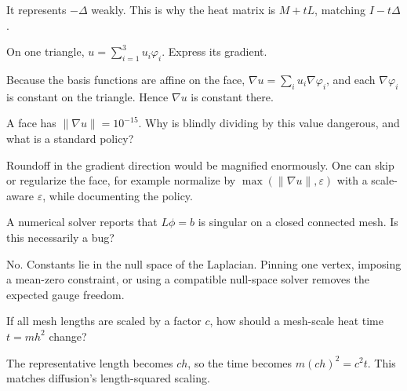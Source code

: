 \begin{solution}
It represents \(-\Delta\) weakly.  This is why the heat matrix is \(M+tL\), matching \(I-t\Delta\).
\end{solution}

\begin{problem}\label{prob:vii40-03}
On one triangle, \(u=\sum_{i=1}^3u_i\varphi_i\).  Express its gradient.
\end{problem}

\begin{solution}
Because the basis functions are affine on the face, \(\nabla u=\sum_i u_i\nabla\varphi_i\), and each \(\nabla\varphi_i\) is constant on the triangle.  Hence \(\nabla u\) is constant there.
\end{solution}

\begin{problem}\label{prob:vii40-04}
A face has \(\|\nabla u\|=10^{-15}\).  Why is blindly dividing by this value dangerous, and what is a standard policy?
\end{problem}

\begin{solution}
Roundoff in the gradient direction would be magnified enormously.  One can skip or regularize the face, for example normalize by \(\max(\|\nabla u\|,\varepsilon)\) with a scale-aware \(\varepsilon\), while documenting the policy.
\end{solution}

\begin{problem}\label{prob:vii40-05}
A numerical solver reports that \(L\phi=b\) is singular on a closed connected mesh.  Is this necessarily a bug?
\end{problem}

\begin{solution}
No.  Constants lie in the null space of the Laplacian.  Pinning one vertex, imposing a mean-zero constraint, or using a compatible null-space solver removes the expected gauge freedom.
\end{solution}

\begin{problem}\label{prob:vii40-06}
If all mesh lengths are scaled by a factor \(c\), how should a mesh-scale heat time \(t=m h^2\) change?
\end{problem}

\begin{solution}
The representative length becomes \(ch\), so the time becomes \(m(ch)^2=c^2t\).  This matches diffusion's length-squared scaling.
\end{solution}

